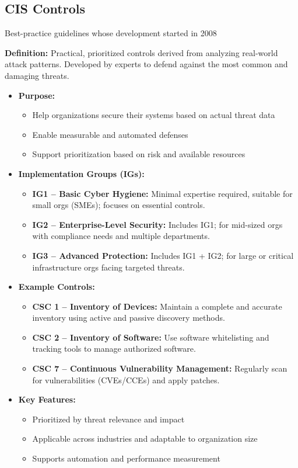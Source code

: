 \subsection{CIS Controls}
{
Best-practice guidelines whose development started in 2008

\textbf{Definition:} Practical, prioritized controls derived from analyzing real-world attack patterns. Developed by experts to defend against the most common and damaging threats.

\begin{itemize}[noitemsep]
  \item \textbf{Purpose:}
    \begin{itemize}[noitemsep]
      \item Help organizations secure their systems based on actual threat data
      \item Enable measurable and automated defenses
      \item Support prioritization based on risk and available resources
    \end{itemize}

  \item \textbf{Implementation Groups (IGs):}
    \begin{itemize}[noitemsep]
      \item \textbf{IG1 – Basic Cyber Hygiene:}  
      Minimal expertise required, suitable for small orgs (SMEs); focuses on essential controls.
      \item \textbf{IG2 – Enterprise-Level Security:}  
      Includes IG1; for mid-sized orgs with compliance needs and multiple departments.
      \item \textbf{IG3 – Advanced Protection:}  
      Includes IG1 + IG2; for large or critical infrastructure orgs facing targeted threats.
    \end{itemize}

  \item \textbf{Example Controls:}
    \begin{itemize}[noitemsep]
      \item \textbf{CSC 1 – Inventory of Devices:}  
      Maintain a complete and accurate inventory using active and passive discovery methods.
      \item \textbf{CSC 2 – Inventory of Software:}  
      Use software whitelisting and tracking tools to manage authorized software.
      \item \textbf{CSC 7 – Continuous Vulnerability Management:}  
      Regularly scan for vulnerabilities (CVEs/CCEs) and apply patches.
    \end{itemize}

  \item \textbf{Key Features:}
    \begin{itemize}[noitemsep]
      \item Prioritized by threat relevance and impact
      \item Applicable across industries and adaptable to organization size
      \item Supports automation and performance measurement
    \end{itemize}
\end{itemize}
}


